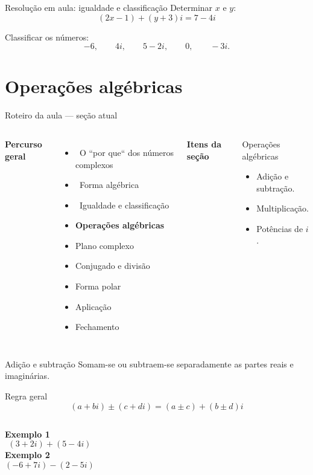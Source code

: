 \documentclass[aspectratio=169]{beamer}
\newcommand{\EspacoEscrita}[1]{%
  \vspace{0.25em}
  \begin{minipage}[t][#1][t]{\linewidth}
  \end{minipage}
}
\newcommand{\secaoPassada}[1]{{\color{ThemeSecondary}\checkmark\ #1}}
\newcommand{\secaoAtual}[1]{{\color{ThemeAccent}\textbf{\large #1}}}
\newcommand{\secaoFutura}[1]{{\color{ThemeDark!55}#1}}
\newcommand{\MapaSecao}[3]{%
\begin{frame}{Roteiro da aula — seção atual}
\vspace{-0.55em}
\begin{columns}[T,onlytextwidth]
\column{0.54\textwidth}
\footnotesize
\textbf{Percurso geral}\par\vspace{0.25em}
#1
\column{0.03\textwidth}
\column{0.35\textwidth}
\footnotesize
\textbf{Itens da seção}\par\vspace{0.25cm}
\begin{block}{#2}
#3
\end{block}
\column{0.03\textwidth}
\end{columns}
\end{frame}
}
\begin{document}
\begin{frame}{Resolução em aula: igualdade e classificação}
\vspace{-0.2em}
\small
Determinar $x$ e $y$:
\[
  (2x-1)+(y+3)i=7-4i
\]

\vspace{0.5em}
Classificar os números:
\[
  -6, \qquad 4i, \qquad 5-2i, \qquad 0, \qquad -3i.
\]
\EspacoEscrita{0.46\textheight}
\end{frame}

\section{Operações algébricas}

\MapaSecao{
\begin{itemize}
  \item \secaoPassada{O ``por que`` dos números complexos}
  \item \secaoPassada{Forma algébrica}
  \item \secaoPassada{Igualdade e classificação}
  \item \secaoAtual{Operações algébricas}
  \item \secaoFutura{Plano complexo}
  \item \secaoFutura{Conjugado e divisão}
  \item \secaoFutura{Forma polar}
  \item \secaoFutura{Aplicação}
  \item \secaoFutura{Fechamento}
\end{itemize}
}{Operações algébricas}{
\begin{itemize}
  \item Adição e subtração.
  \item Multiplicação.
  \item Potências de $i$.
\end{itemize}
}

\begin{frame}{Adição e subtração}
\vspace{-0.45em}
\small
Somam-se ou subtraem-se separadamente as partes reais e imaginárias.

\begin{block}{Regra geral}
\[
  (a+bi)\pm(c+di)=(a\pm c)+(b\pm d)i
\]
\end{block}
\begin{columns}[T,onlytextwidth]
\textbf{Exemplo 1}
\[(3+2i)+(5-4i)\]
\textbf{Exemplo 2}
\[(-6+7i)-(2-5i)\]
\end{columns}
\EspacoEscrita{0.25\textheight}
\end{frame}
\end{document}

